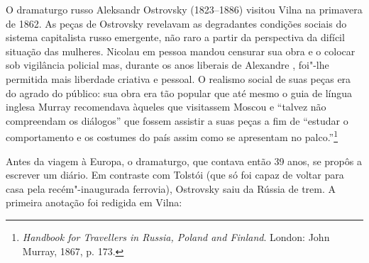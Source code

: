 O dramaturgo russo Aleksandr Ostrovsky (1823--1886) visitou Vilna na
primavera de 1862. As peças de Ostrovsky revelavam as degradantes
condições sociais do sistema capitalista russo emergente, não raro a
partir da perspectiva da difícil situação das mulheres. Nicolau  em
pessoa mandou censurar sua obra e o colocar sob vigilância policial mas,
durante os anos liberais de Alexandre , foi"-lhe permitida mais
liberdade criativa e pessoal. O realismo social de suas peças era do
agrado do público: sua obra era tão popular que até mesmo o guia de
língua inglesa Murray recomendava àqueles que visitassem Moscou e
``talvez não compreendam os diálogos'' que fossem assistir a suas peças
a fim de ``estudar o comportamento e os costumes do país assim como se
apresentam no palco.''\footnote{\emph{Handbook for Travellers in Russia,
  Poland and Finland}. London: John Murray, 1867, p. 173.}

Antes da viagem à Europa, o dramaturgo, que contava então 39 anos, se
propôs a escrever um diário. Em contraste com Tolstói (que só foi capaz
de voltar para casa pela recém"-inaugurada ferrovia), Ostrovsky saiu da
Rússia de trem. A primeira anotação foi redigida em Vilna:

